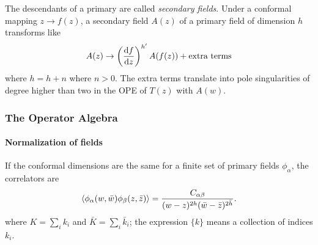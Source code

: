 \documentclass[10pt]{article}
\begin{document}
The descendants of a primary are called \textit{secondary fields}.
Under a conformal mapping $z\to f(z)$, a secondary field $A(z)$ of a primary field of dimension $h$ transforms like 
\begin{align}
    A(z)\to\left(\dv{f}{z}\right)^{h'}A(f(z))+\text{extra terms}
\end{align}
where $h=h+n$ where $n>0$. 
The extra terms translate into pole singularities of degree higher than two in the OPE of $T(z)$ with $A(w)$.
\subsubsection{The Operator Algebra}
\paragraph{Normalization of fields}
If the conformal dimensions are the same for a finite set of primary fields $\phi_\alpha$, the correlators are 
\begin{align}
    \expval{\phi_\alpha(w,\bar{w})\phi_{\beta}(z,\bar{z})}=\frac{C_{\alpha\beta}}{(w-z)^{2h}(\bar{w}-\bar{z})^{2\bar{h}}}.
\end{align}
where $K=\sum_i k_i$ and $\bar{K}=\sum_i \bar{k}_i$; the expression $\{k\}$ means a collection of indices $k_i$.
\end{document}
